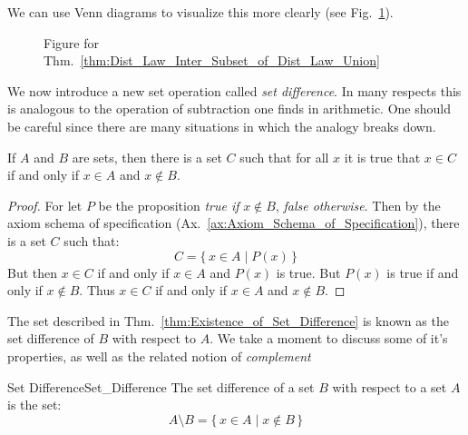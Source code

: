         We can use Venn diagrams to visualize this more clearly (see
        Fig.~\ref{fig:Venn_Diagram_Compare_Dist_Laws_Unions_Intersections}).
        \begin{figure}[H]
            \centering
            \captionsetup{type=figure}
            
            \caption{Figure for
                     Thm.~\ref{thm:Dist_Law_Inter_Subset_of_Dist_Law_Union}}
            \label{fig:Venn_Diagram_Compare_Dist_Laws_Unions_Intersections}
        \end{figure}
        We now introduce a new set operation called
        \textit{set difference}. In many respects this is
        analogous to the operation of subtraction one finds in arithmetic. One
        should be careful since there are many situations in which the analogy
        breaks down.
        \begin{theorem}
            \label{thm:Existence_of_Set_Difference}%
            If $A$ and $B$ are sets, then there is a set $C$ such that for all
            $x$ it is true that $x\in{C}$ if and only if $x\in{A}$ and
            $x\notin{B}$.
        \end{theorem}
        \begin{proof}
            For let $P$ be the proposition \textit{true if} $x\notin{B}$,
            \textit{false otherwise}. Then by the axiom schema of specification
            (Ax.~\ref{ax:Axiom_Schema_of_Specification}), there is a set $C$
            such that:
            \begin{equation}
                C=\{\,x\in{A}\;|\;P(x)\,\}
            \end{equation}
            But then $x\in{C}$ if and only if $x\in{A}$ and $P(x)$ is true.
            But $P(x)$ is true if and only if $x\notin{B}$. Thus $x\in{C}$ if
            and only if $x\in{A}$ and $x\notin{B}$.
        \end{proof}
        The set described in Thm.~\ref{thm:Existence_of_Set_Difference} is known
        as the set difference of $B$ with respect to $A$. We take a moment to
        discuss some of it's properties, as well as the related notion of
        \textit{complement}
        \begin{fdefinition}{Set Difference}{Set_Difference}
            The set difference of a set $B$ with respect to a set $A$ is the
            set:
            \begin{equation*}
                A\setminus{B}=\{\,x\in{A}\;|\;x\notin{B}\,\}
            \end{equation*}
        \end{fdefinition}
